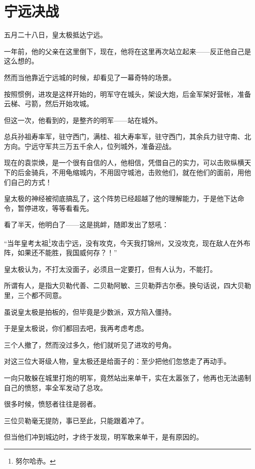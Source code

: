 \section{宁远决战}
\ifnum{}
	\begin{multicols}{\theparacolNo}
		\fi
		五月二十八日，皇太极抵达宁远。

		一年前，他的父亲在这里倒下，现在，他将在这里再次站立起来——反正他自己是这么想的。

		然而当他靠近宁远城的时候，却看见了一幕奇特的场景。

		按照惯例，进攻是这样开始的，明军守在城头，架设大炮，后金军架好营帐，准备云梯、弓箭，然后开始攻城。

		但这一次，他看到的，是整齐的明军——站在城外。

		总兵孙祖寿率军，驻守西门，满桂、祖大寿率军，驻守西门，其余兵力驻守南、北方向。宁远守军共三万五千余人，位列城外，准备迎战。

		现在的袁崇焕，是一个很有自信的人，他相信，凭借自己的实力，可以击败纵横天下的后金骑兵，不用龟缩城内，不用固守城池，击败他们，就在他们的面前，用他们自己的方式！

		皇太极的神经被彻底搞乱了，这个阵势已经超越了他的理解能力，于是他下达命令，暂停进攻，等等看看先。

		看了半天，他明白了——这是挑衅，随即发出了怒吼：

		“当年皇考太祖\footnote{努尔哈赤。}攻击宁远，没有攻克，今天我打锦州，又没攻克，现在敌人在外布阵，如果还不能胜，我国威何存？！”

		皇太极认为，不打太没面子，必须且一定要打，但有人认为，不能打。

		所谓有人，是指大贝勒代善、二贝勒阿敏、三贝勒莽古尔泰。换句话说，四大贝勒里，三个都不同意。

		虽说皇太极是拍板的，但毕竟是少数派，双方陷入僵持。

		于是皇太极说，你们都回去吧，我再考虑考虑。

		三个人撤了，然而没过多久，他们就听见了进攻的号角。

		对这三位大哥级人物，皇太极还是给面子的：至少把他们忽悠走了再动手。

		一向只敢躲在城里打炮的明军，竟然站出来单干，实在太嚣张了，他再也无法遏制自己的愤怒，率全军发动了总攻。

		很多时候，愤怒者往往是弱者。

		三位贝勒毫无提防，事已至此，只能跟着冲了。

		但当他们冲到城边时，才终于发现，明军敢来单干，是有原因的。


\end{multicols}
